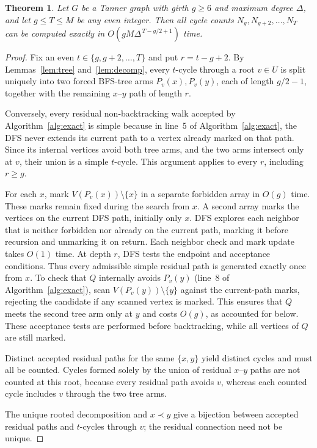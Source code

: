 \documentclass[conference]{IEEEtran}
\newtheorem{theorem}{Theorem}
\begin{document}
\begin{theorem}\label{thm:exact}
Let $G$ be a Tanner graph with girth $g\ge6$ and maximum degree $\Delta$, and let
$g\le T\le M$ be any even integer. Then all cycle counts $N_g,N_{g+2},\ldots,N_T$
can be computed exactly in $O\!\left(gM\Delta^{\,T-g/2+1}\right)$
time. 
\end{theorem}
\begin{proof}
Fix an even $t\in\{g,g+2,\ldots,T\}$ and put $r=t-g+2$. By
Lemmas~\ref{lem:tree} and~\ref{lem:decomp}, every $t$-cycle through a root
$v\in U$ is split uniquely into two forced BFS-tree arms
$P_v(x),P_v(y)$, each of length $g/2-1$, together with the remaining
$x$--$y$ path of length $r$.

Conversely, every residual non-backtracking walk accepted by Algorithm~\ref{alg:exact}
is simple because in line~5 of Algorithm~\ref{alg:exact}, the DFS never extends its current path to a vertex
already marked on that path. Since its internal vertices avoid both tree
arms, and the two arms intersect only at $v$, their union is a simple
$t$-cycle. This argument applies to every $r$, including $r\ge g$.

For each $x$, mark $V(P_v(x))\setminus\{x\}$ in a separate forbidden
array in $O(g)$ time. These marks remain fixed during the search from
$x$. A second array marks the vertices on the current DFS path,
initially only $x$. DFS explores each neighbor that is neither
forbidden nor already on the current path, marking it before recursion
and unmarking it on return. Each neighbor check and mark update takes
$O(1)$ time. At depth $r$, DFS tests the endpoint and acceptance
conditions. Thus every admissible simple residual path is generated
exactly once from $x$. To check that $Q$ internally avoids $P_v(y)$
(line~8 of Algorithm~\ref{alg:exact}), scan
$V(P_v(y))\setminus\{y\}$ against the current-path marks, rejecting
the candidate if any scanned vertex is marked. This ensures that $Q$
meets the second tree arm only at $y$ and costs $O(g)$, as accounted
for below. These acceptance tests are performed before backtracking,
while all vertices of $Q$ are still marked.

Distinct accepted residual paths for the same $\{x,y\}$ yield distinct
cycles and must all be counted. 
Cycles formed solely by the union of residual $x$--$y$ paths are not
counted at this root, because every residual path avoids $v$, whereas each
counted cycle includes $v$ through the two tree arms.

The unique rooted decomposition and $x\prec y$ give a bijection between
accepted residual paths and $t$-cycles through $v$; the residual connection
need not be unique.


\end{proof}
\end{document}
